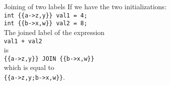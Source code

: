 \begin{example}{Joining of two labels}
  If we have the two initializations:\\
  \texttt{int \{\{a->z,y\}\} val1 = 4;}\\
  \texttt{int \{\{b->x,w\}\} val2 = 8;}\\[1em]
  The joined label of the expression\\
   \texttt{val1 + val2}\\
   is\\
   \texttt{\{\{a->z,y\}\} JOIN \{\{b->x,w\}\}}\\
   which is equal to\\
   \texttt{\{\{a->z,y;b->x,w\}\}}.
\end{example}
